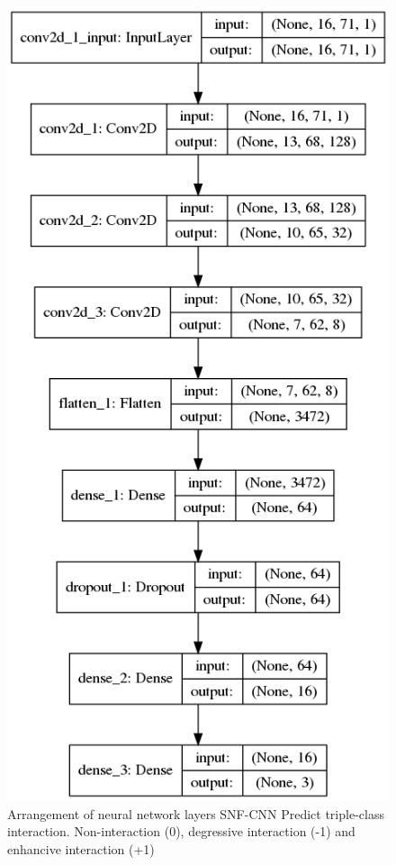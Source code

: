 \documentclass{bmcart}
\begin{document}
\begin{figure}[!h]
	\centering
	\includegraphics[scale=0.43]{lastTripleModel/modelTripleLayers.png}
	\caption{Arrangement of neural network layers SNF-CNN Predict triple-class interaction. Non-interaction (0), degressive interaction (-1) and enhancive interaction (+1)}
	\label{Triple_model}
\end{figure}
\end{document}

